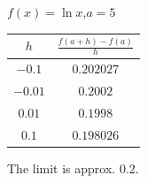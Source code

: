 {$\displaystyle f(x) =\ln x$,\quad  $a=5$}
{\begin{tabular}{cc}
$h$ & $\frac{f(a+h)-f(a)}{h}$\\ \hline
 $ -0.1$ & $0.202027$ \\
 $-0.01$ & $0.2002$ \\
 $0.01$ & $0.1998$ \\
 $0.1$ & $0.198026$
\end{tabular}

The limit is approx. $0.2$.
}
